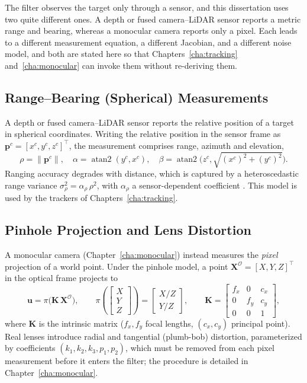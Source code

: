 The filter observes the target only through a sensor, and this dissertation uses
two quite different ones. A depth or fused camera--LiDAR sensor reports a metric
range and bearing, whereas a monocular camera reports only a pixel. Each leads to
a different measurement equation, a different Jacobian, and a different noise
model, and both are stated here so that Chapters~\ref{cha:tracking}
and~\ref{cha:monocular} can invoke them without re-deriving them.

\subsection{Range--Bearing (Spherical) Measurements}

A depth or fused camera--LiDAR sensor reports the relative position of a target in
spherical coordinates. Writing the relative position in the sensor frame as
$\bm{p}^{c}=[x^{c},y^{c},z^{c}]^{\top}$, the measurement comprises range, azimuth
and elevation,
\begin{equation}
  \rho = \lVert\bm{p}^{c}\rVert,\quad
  \alpha = \operatorname{atan2}(y^{c},x^{c}),\quad
  \beta = \operatorname{atan2}\!\big(z^{c},\sqrt{(x^{c})^2+(y^{c})^2}\big).
  \label{eq:spherical}
\end{equation}
Ranging accuracy degrades with distance, which is captured by a heteroscedastic
range variance $\sigma_\rho^2 = \alpha_\rho\,\rho^2$, with $\alpha_\rho$ a
sensor-dependent coefficient \cite{fernandes2020}. This model is used by the
trackers of Chapters~\ref{cha:tracking}.

\subsection{Pinhole Projection and Lens Distortion}

A monocular camera (Chapter~\ref{cha:monocular}) instead measures the
\emph{pixel} projection of a world point. Under the pinhole model, a point
$\bm{X}^{\mathcal{O}}=[X,Y,Z]^{\top}$ in the optical frame projects to
\begin{equation}
  \bm{u} = \pi\!\big(\bm{K}\,\bm{X}^{\mathcal{O}}\big),
  \qquad
  \pi\!\left(\begin{bmatrix}X\\Y\\Z\end{bmatrix}\right) = \begin{bmatrix}X/Z\\Y/Z\end{bmatrix},
  \qquad
  \bm{K}=\begin{bmatrix} f_x & 0 & c_x \\ 0 & f_y & c_y \\ 0 & 0 & 1 \end{bmatrix},
  \label{eq:pinhole}
\end{equation}
where $\bm{K}$ is the intrinsic matrix ($f_x,f_y$ focal lengths, $(c_x,c_y)$
principal point). Real lenses introduce radial and tangential (plumb-bob)
distortion, parameterized by coefficients $(k_1,k_2,k_3,p_1,p_2)$, which must be
removed from each pixel measurement before it enters the filter; the procedure is
detailed in Chapter~\ref{cha:monocular}.

